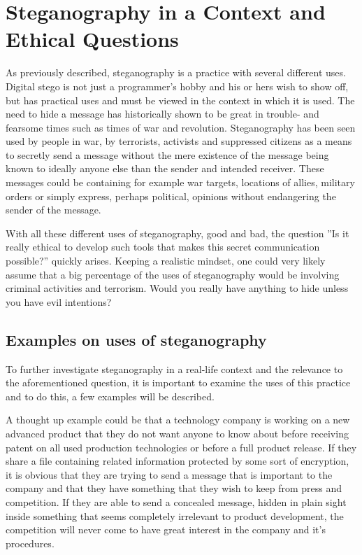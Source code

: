 \section{Steganography in a Context and Ethical Questions}
As previously described, steganography is a practice with several different uses.
Digital stego is not just a programmer's hobby and his or hers wish to show off, but has practical uses and must be viewed in the context in which it is used.
The need to hide a message has historically shown to be great in trouble- and fearsome times such as times of war and revolution.
Steganography has been seen used by people in war, by terrorists, activists and suppressed citizens as a means to secretly send a message without the mere existence of the message being known to ideally anyone else than the sender and intended receiver.
These messages could be containing for example war targets, locations of allies, military orders or simply express, perhaps political, opinions without endangering the sender of the message.


With all these different uses of steganography, good and bad, the question ''Is it really ethical to develop such tools that makes this secret communication possible?'' quickly arises. Keeping a realistic mindset, one could very likely assume that a big percentage of the uses of steganography would be involving criminal activities and terrorism. Would you really have anything to hide unless you have evil intentions?

\subsection{Examples on uses of steganography}
To further investigate steganography in a real-life context and the relevance to the aforementioned question, it is important to examine the uses of this practice and to do this, a few examples will be described.

A thought up example could be that a technology company is working on a new advanced product that they do not want anyone to know about before receiving patent on all used production technologies or before a full product release.
If they share a file containing related information protected by some sort of encryption, it is obvious that they are trying to send a message that is important to the company and that they have something that they wish to keep from press and competition.
If they are able to send a concealed message, hidden in plain sight inside something that seems completely irrelevant to product development, the competition will never come to have great interest in the company and it's procedures.

